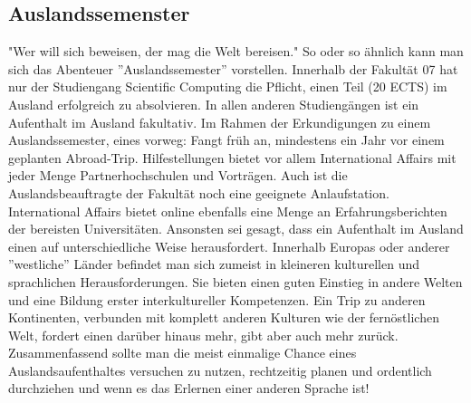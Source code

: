 \subsection{Auslandssemenster}
"Wer will sich beweisen, der mag die Welt bereisen."\doublebreak
So oder so ähnlich kann man sich das Abenteuer ''Auslandssemester'' 
vorstellen. Innerhalb der Fakultät 07 hat nur der Studiengang Scientific 
Computing die Pflicht, einen Teil (20 ECTS) im Ausland erfolgreich zu 
absolvieren. In allen anderen Studiengängen ist ein Aufenthalt im 
Ausland fakultativ. \doublebreak
Im Rahmen der Erkundigungen zu einem Auslandssemester, eines
vorweg: Fangt früh an, mindestens ein Jahr vor einem geplanten
Abroad-Trip. Hilfestellungen bietet vor allem International Affairs
mit jeder Menge Partnerhochschulen und Vorträgen. Auch ist die Auslandsbeauftragte der Fakultät noch eine geeignete
Anlaufstation. International Affairs bietet online ebenfalls eine Menge 
an Erfahrungsberichten der bereisten Universitäten.\doublebreak
Ansonsten sei gesagt, dass ein Aufenthalt im Ausland einen auf 
unterschiedliche Weise herausfordert. Innerhalb Europas oder anderer 
''westliche'' Länder befindet man sich zumeist in kleineren kulturellen
und sprachlichen Herausforderungen. \doublebreak
Sie bieten einen guten Einstieg in andere Welten und eine Bildung 
erster interkultureller Kompetenzen. Ein Trip zu anderen Kontinenten,
verbunden mit komplett anderen Kulturen wie der fernöstlichen Welt, 
fordert einen darüber hinaus mehr, gibt aber auch mehr zurück.\doublebreak 
Zusammenfassend sollte man die meist einmalige Chance eines 
Auslandsaufenthaltes versuchen zu nutzen, rechtzeitig planen und 
ordentlich durchziehen und wenn es das Erlernen einer anderen 
Sprache ist! 